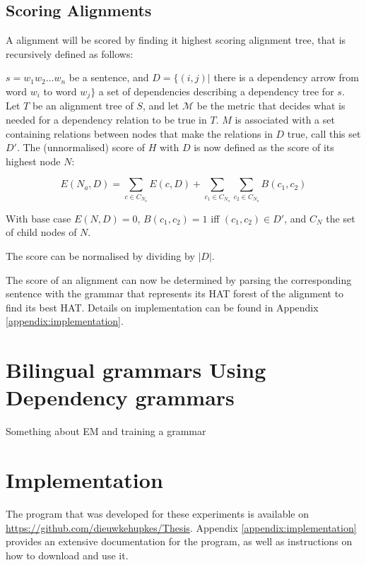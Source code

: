 \documentclass{report}
\begin{document}
\subsection{Scoring Alignments}

A alignment will be scored by finding it highest scoring alignment tree, that is recursively defined as follows:

\begin{definition}
 $s = w_1 w_2 \dots w_n$ be a sentence, and $D = \{ (i,j) |$ there is a dependency arrow from word $w_i$ to word $w_j \}$ a set of dependencies describing a dependency tree for $s$. Let $T$ be an alignment tree of $S$, and let $\mathcal{M}$ be the metric that decides what is needed for a dependency relation to be true in $T$. $M$ is associated with a set containing relations between nodes that make the relations in $D$ true, call this set $D'$. The (unnormalised) score of $H$ with $D$ is now defined as the score of its highest node $N$:

$$
E(N_a,D) = \sum_{c\in C_{N_a}} E(c,D)+ \sum_{c_1\in C_{N_a}} \sum_{c_2\in C_{N_a}} B(c_1,c_2)
$$

\noindent With base case $E(N,D) = 0$, $B(c_1,c_2) = 1$ iff  $(c_1,c_2)\in D'$, and $C_N$ the set of child nodes of $N$.

The score can be normalised by dividing by $|D|$.
\end{definition}

The score of an alignment can now be determined by parsing the corresponding sentence with the grammar that represents its HAT forest of the alignment to find its best HAT. Details on implementation can be found in Appendix \ref{appendix:implementation}.

\section{Bilingual grammars Using Dependency grammars}

Something about EM and training a grammar


\section{Implementation}

The program that was developed for these experiments is available on
\href{https://github.com/dieuwkehupkes/Thesis}{https://github.com/dieuwkehupkes/Thesis}. Appendix \ref{appendix:implementation} provides an extensive documentation for the program, as well as instructions on how to download and use it.


\end{document}
